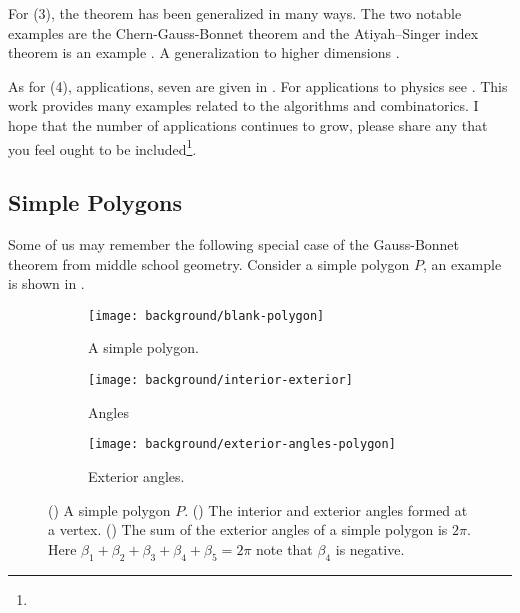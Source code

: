 For (3), the theorem has been generalized in many ways.
The two notable examples are the Chern-Gauss-Bonnet theorem\cite{chern_simple_1944} and
the Atiyah–Singer index theorem is an example  \cite{atiyah_index_1963}.
A generalization to higher dimensions \cite{guillemin_differential_2010}.


As for (4), applications, 
seven are given in \cite{doc76}.
For applications to physics see \cite{tirado-physics-apps,gibbons_applications_2008}.
This work provides many examples related to the algorithms and combinatorics. 
I hope that the number of applications continues to grow,
please share any that you feel
ought to be included\footnote{}.


\subsection{Simple Polygons}
\label{sec:warm-up}

Some of us may remember the following special case
of the Gauss-Bonnet theorem from middle school geometry.
Consider a simple polygon $P$, an example is shown in .

 \begin{figure}[htb]
         \centering
          \begin{subfigure}[b]{0.30\textwidth}
      		   \texttt{[image: background/blank-polygon]}
    		    \caption{A simple polygon.}
 		 \label{fig:polygon}
	 \end{subfigure}
	 \hspace{.5cm}
	 \begin{subfigure}[b]{0.25\textwidth}
       		  \texttt{[image: background/interior-exterior]}
     		    \caption{Angles}
 		 \label{fig:interior-exterior}
       \end{subfigure}
        \hspace{.5cm}
     \begin{subfigure}[b]{0.27\textwidth}
       		  \texttt{[image: background/exterior-angles-polygon]}
       		  \caption{Exterior angles.}
       		   \label{fig:exterior-angles}
         \end{subfigure}
		\caption{() A simple polygon $P.$
		() The interior and exterior angles formed at a vertex.
 		 () The sum of the exterior angles of a simple
		polygon is $2\pi$. Here
		$\beta_1+\beta_2+\beta_3+\beta_4+\beta_5=2\pi$ note that $\beta_4$ is negative.
 		\label{fig:simple-polygon}}
 \end{figure}

